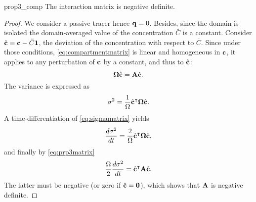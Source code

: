 \begin{propertybis}{prop3_comp} \label{prop3bis_comp}
	The interaction matrix is negative definite.
\end{propertybis}
\begin{proof}
	We consider a passive tracer hence $\mathbf q = 0$. Besides, since the domain is isolated the domain-averaged value of the concentration $\bar C$ is a constant.
	Consider $\hat{\mathbf c} = \mathbf c - \bar C \mathbf 1$, the deviation of the concentration with respect to $\bar C$. Since under those conditions, \eqref{eq:compartmentmatrix} is linear and homogeneous in $\mathbf c$, it applies to any perturbation of $\mathbf c$ by a constant, and thus to $\hat{\mathbf c}$:
	\begin{equation} \label{eq:prp3matrix}
		\boldsymbol \Omega \dot{\hat{\mathbf c}} = \mathbf A \hat{\mathbf c}.
	\end{equation}
	The variance is expressed as
	\begin{equation}\label{eq:sigmamatrix}
		\sigma^2 = \frac{1}{\Omega} \hat{\mathbf c}^\intercal \boldsymbol \Omega \hat{\mathbf c}.
	\end{equation}
	A time-differentiation of \eqref{eq:sigmamatrix} yields
	\begin{equation}
		\frac{d \sigma^2}{dt} = \frac{2}{\Omega} \hat{\mathbf c}^\intercal \boldsymbol \Omega \dot{\hat{\mathbf c}},
	\end{equation}
	and finally by \eqref{eq:prp3matrix}
	\begin{equation}
		\frac{\Omega}{2} \frac{d \sigma^2}{dt} = \hat{\mathbf c}^\intercal \mathbf A \hat{\mathbf c}.
	\end{equation}
	The latter must be negative (or zero if $\hat{\mathbf c} = \mathbf 0$), which shows that $\mathbf A$ is negative definite.
\end{proof}